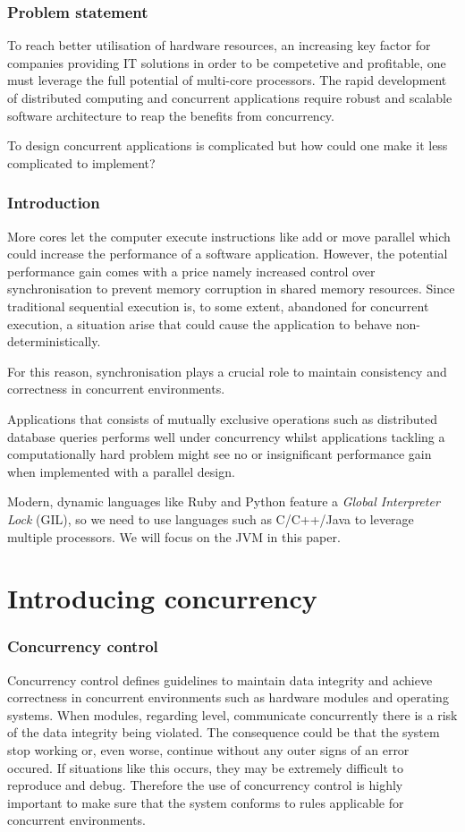 \documentclass[a4paper,12pt]{kth-mag}
\begin{document}
\section{Problem statement}
To reach better utilisation of hardware resources, an increasing key factor for companies providing IT solutions in order to be competetive and profitable, one must leverage the full potential of multi-core processors. The rapid development of distributed computing and concurrent applications require robust and scalable software architecture to reap the benefits from concurrency.

To design concurrent applications is complicated but how could one make it less complicated to implement?

\section{Introduction}
More cores let the computer execute instructions like add or move parallel which could increase the performance of a software application. However, the potential performance gain comes with a price namely increased control over synchronisation to prevent memory corruption in shared memory resources. Since traditional sequential execution is, to some extent, abandoned for concurrent execution, a situation arise that could cause the application to behave non-deterministically.

For this reason, synchronisation plays a crucial role to maintain consistency and correctness in concurrent environments.

Applications that consists of mutually exclusive operations such as distributed database queries performs well under concurrency whilst applications tackling a computationally hard problem might see no or insignificant performance gain when implemented with a parallel design.

Modern, dynamic languages like Ruby and Python feature a \textit{Global Interpreter Lock} (GIL), so we need to use languages such as C/C++/Java to leverage multiple processors. We will focus on the JVM in this paper.  

\part{Introducing concurrency}

\section{Concurrency control} \label{sec:con_con}
Concurrency control defines guidelines to maintain data integrity and achieve correctness in concurrent environments such as hardware modules and operating systems\cite{concon}. When modules, regarding level, communicate concurrently there is a risk of the data integrity being violated. The consequence could be that the system stop working or, even worse, continue without any outer signs of an error occured. If situations like this occurs, they may be extremely difficult to reproduce and debug. Therefore the use of concurrency control is highly important to make sure that the system conforms to rules applicable for concurrent environments.
\end{document}
